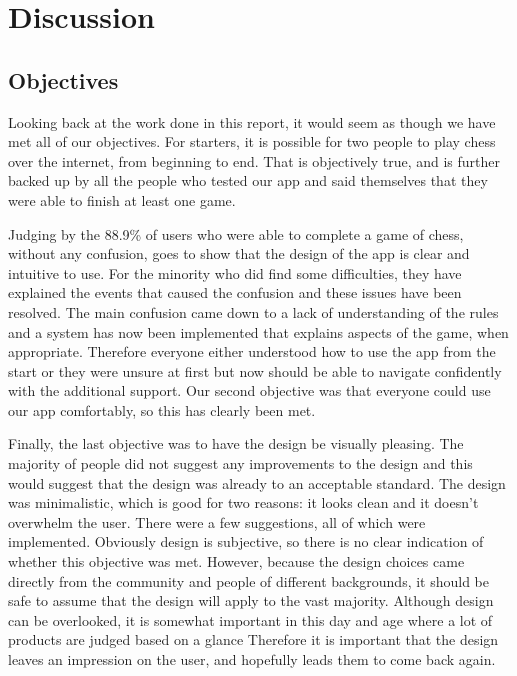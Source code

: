 \chapter{Discussion}
\label{chapter4}

\section{Objectives}

Looking back at the work done in this report, it would seem as though we have met all of our objectives. For starters, it is possible for two people to play chess over the internet, from beginning to end. That is objectively true, and is further backed up by all the people who tested our app and said themselves that they were able to finish at least one game.

Judging by the 88.9\% of users who were able to complete a game of chess, without any confusion, goes to show that the design of the app is clear and intuitive to use. For the minority who did find some difficulties, they have explained the events that caused the confusion and these issues have been resolved. The main confusion came down to a lack of understanding of the rules and a system has now been implemented that explains aspects of the game, when appropriate. Therefore everyone either understood how to use the app from the start or they were unsure at first but now should be able to navigate confidently with the additional support. Our second objective was that everyone could use our app comfortably, so this has clearly been met.

Finally, the last objective was to have the design be visually pleasing. The majority of people did not suggest any improvements to the design and this would suggest that the design was already to an acceptable standard. The design was minimalistic, which is good for two reasons: it looks clean and it doesn't overwhelm the user. There were a few suggestions, all of which were implemented. Obviously design is subjective, so there is no clear indication of whether this objective was met. However, because the design choices came directly from the community and people of different backgrounds, it should be safe to assume that the design will apply to the vast majority. Although design can be overlooked, it is somewhat important in this day and age where a lot of products are judged based on a glance Therefore it is important that the design leaves an impression on the user, and hopefully leads them to come back again.

